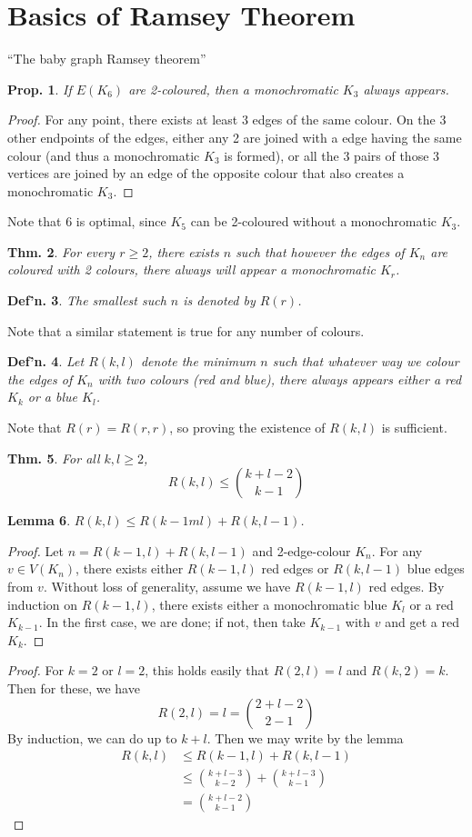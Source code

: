 \documentclass[12pt, a4paper]{book}
\newtheorem{theorem}{Thm.}[section]
\newtheorem{lemma}[theorem]{Lemma}
\newtheorem{definition}[theorem]{Def'n.}
\newtheorem{proposition}[theorem]{Prop.}
\theoremstyle{nonumberplain}
\newtheorem{proof}{Proof}
\begin{document}
\section{Basics of Ramsey Theorem}
``The baby graph Ramsey theorem''
\begin{proposition}
    If $E(K_6)$ are 2-coloured, then a monochromatic $K_3$ always appears.
\end{proposition}
\begin{proof}
    For any point, there exists at least 3 edges of the same colour.
    On the 3 other endpoints of the edges, either any 2 are joined with a edge having the same colour (and thus a monochromatic $K_3$ is formed), or all the 3 pairs of those 3 vertices are joined by an edge of the opposite colour that also creates a monochromatic $K_3$.
\end{proof}
Note that $6$ is optimal, since $K_5$ can be 2-coloured without a monochromatic $K_3$.
\begin{theorem}
    For every $r\geq 2$, there exists $n$ such that however the edges of $K_n$ are coloured with 2 colours, there always will appear a monochromatic $K_r$.
\end{theorem}
\begin{definition}
    The smallest such $n$ is denoted by $R(r)$.
\end{definition}
Note that a similar statement is true for any number of colours.
\begin{definition}
    Let $R(k,l)$ denote the minimum $n$ such that whatever way we colour the edges of $K_n$ with two colours (red and blue), there always appears either a red $K_k$ or a blue $K_l$.
\end{definition}
Note that $R(r)=R(r,r)$, so proving the existence of $R(k,l)$ is sufficient.
\begin{theorem}
    For all $k,l\geq 2$,
    \[R(k,l)\leq\binom{k+l-2}{k-1}\]
\end{theorem}
\begin{lemma}
    $R(k,l)\leq R(k-1ml)+R(k,l-1)$.
\end{lemma}
\begin{proof}
    Let $n=R(k-1,l)+R(k,l-1)$ and 2-edge-colour $K_n$.
    For any $v\in V(K_n)$, there exists either $R(k-1,l)$ red edges or $R(k,l-1)$ blue edges from $v$.
    Without loss of generality, assume we have $R(k-1,l)$ red edges.
    By induction on $R(k-1,l)$, there exists either a monochromatic blue $K_l$ or a red $K_{k-1}$.
    In the first case, we are done; if not, then take $K_{k-1}$ with $v$ and get a red $K_k$.
\end{proof}
\begin{proof}
    For $k=2$ or $l=2$, this holds easily that $R(2,l)=l$ and $R(k,2)=k$.
    Then for these, we have
    \[R(2,l)=l=\binom{2+l-2}{2-1}\]
    By induction, we can do up to $k+l$.
    Then we may write by the lemma
    \begin{align*}
        R(k,l) &\leq R(k-1,l)+R(k,l-1)\\
               &\leq \binom{k+l-3}{k-2}+\binom{k+l-3}{k-1}\\
               &= \binom{k+l-2}{k-1}
    \end{align*}
\end{proof}
\end{document}

